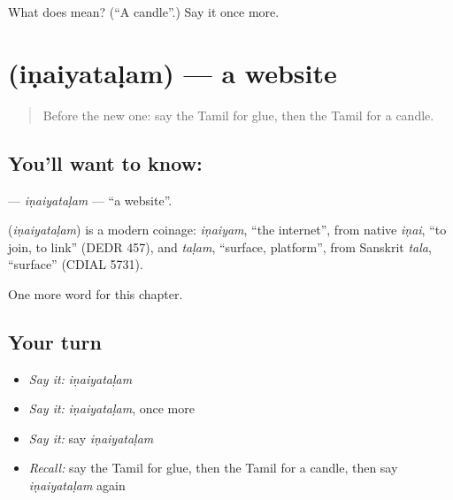 \begin{tcolorbox}[breakable,colback=teal!4,colframe=teal!35!black,title={Before you move on}]
What does  mean? (\textquotedblleft{}A candle\textquotedblright{}.) Say it once more.
\end{tcolorbox}
\section[\texorpdfstring{\ta{இணையதளம்} (iṇaiyataḷam)}{இணையதளம் (iṇaiyataḷam)}]{ (iṇaiyataḷam) — a website}

\label{lesson:TA-C189-inaiyatalam}



\begin{quote}
Before the new one: say the Tamil for glue, then the Tamil for a candle.
\end{quote}

\subsection*{You'll want to know: }
\textbf{} — \emph{iṇaiyataḷam} — \textquotedblleft{}a website\textquotedblright{}.

\begin{cousinweb}
\textbf{} (\emph{iṇaiyataḷam}) is a modern coinage: \emph{iṇaiyam}, \textquotedblleft{}the internet\textquotedblright{}, from native \emph{iṇai}, \textquotedblleft{}to join, to link\textquotedblright{} (DEDR 457), and \emph{taḷam}, \textquotedblleft{}surface, platform\textquotedblright{}, from Sanskrit \emph{tala}, \textquotedblleft{}surface\textquotedblright{} (CDIAL 5731).
\end{cousinweb}

\begin{grammarlens}[title={What you've built}]
One more word for this chapter.
\end{grammarlens}

\subsection*{Your turn}
\begin{itemize}
\raggedright
  \item \emph{Say it:} \emph{iṇaiyataḷam}
  \item \emph{Say it:} \emph{iṇaiyataḷam}, once more
  \item \emph{Say it:} say \emph{iṇaiyataḷam}
  \item \emph{Recall:} say the Tamil for glue, then the Tamil for a candle, then say \emph{iṇaiyataḷam} again
\end{itemize}

